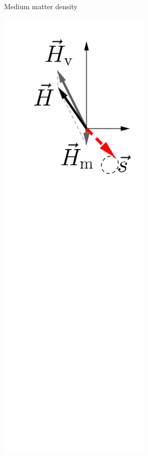 \begin{figure}[htbp]
\begin{subfigure}[t]{0.3\textwidth}
		\caption{Medium matter density}\label{chap:basics-sec:flavor-isospin-pic-fig:msw-adiabatic-medium-density}		
	\end{subfigure}
	\quad
	\begin{subfigure}[t]{0.3\textwidth}
		\centering
		\includegraphics[width=0.8\textwidth]{chapters/assets/basics/matter-effect-adiabatic-small-density}

\end{subfigure}
\end{figure}
